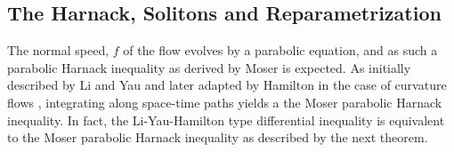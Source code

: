


\subsection{The Harnack, Solitons and Reparametrization}
\label{subsec:reparam}

The normal speed, $f$ of the flow evolves by a parabolic equation, and as such a parabolic Harnack inequality as derived by Moser \cite{Moser:02/1964} is expected. As initially described by Li and Yau \cite{LiYau:/1986} and later adapted by Hamilton in the case of curvature flows \cite{Hamilton:/1986,Hamilton:/1993,Hamilton:/1995}, integrating along space-time paths yields a the Moser parabolic Harnack inequality. In fact, the Li-Yau-Hamilton type differential inequality is equivalent to the Moser parabolic Harnack inequality as described by the next theorem.

